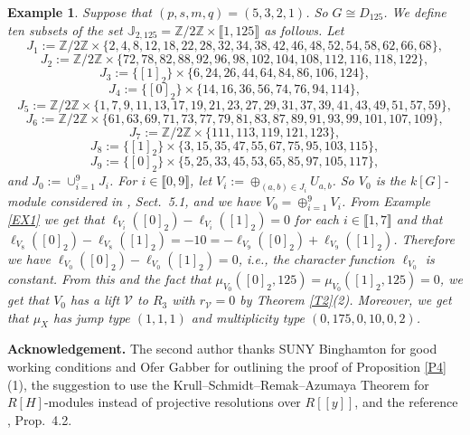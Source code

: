 \documentclass[11pt]{amsart}
\newtheorem{ex}[theorem]{Example}
\begin{document}
\begin{ex}\normalfont\label{EX14}
Suppose that $(p,s,m,q)=(5,3,2,1)$. So $G\cong D_{125}$. We define ten subsets of the set $\mathbb J_{2,125}=\mathbb Z/2\mathbb Z\times\llbracket1,125\rrbracket$ as follows. Let
$$J_1:=\mathbb Z/2\mathbb Z\times\{2,4,8,12,18,22,28,32,34,38,42,46,48,52,54,58,62,66,68\},$$
$$J_2:=\mathbb Z/2\mathbb Z\times\{72,78,82,88,92,96,98,102,104,108,112,116,118,122\},$$
$$J_3:=\{[1]_2\}\times\{6,24,26,44,64,84,86,106,124\},$$
$$J_4:=\{[0]_2\}\times\{14,16,36,56,74,76,94,114\},$$
$$J_5:=\mathbb Z/2\mathbb Z\times\{1,7,9,11,13,17,19,21,23,27,29,31,37,39,41,43,49,51,57,59\},$$
$$J_6:=\mathbb Z/2\mathbb Z\times\{61,63,69,71,73,77,79,81,83,87,89,91,93,99,101,107,109\},$$
$$J_7:=\mathbb Z/2\mathbb Z\times\{111,113,119,121,123\},$$
$$J_8:=\{[1]_2\}\times\{3,15,35,47,55,67,75,95,103,115\},$$
$$J_9:=\{[0]_2\}\times\{5,25,33,45,53,65,85,97,105,117\},$$
and $ J_0:=\cup_{i=1}^9 J_i$. For $i\in\llbracket0,9\rrbracket$, let $V_i:=\oplus_{(a,b)\in J_i} U_{a,b}$. So $V_0$ is the $k[G]$-module considered in \cite{KT2}, Sect.\ 5.1, and we have $V_0=\oplus_{i=1}^9 V_i$. From Example \ref{EX1} we get that $\ell_{V_i}([0]_2)-\ell_{V_i}([1]_2)=0$ for each $i\in\llbracket1,7\rrbracket$ and that $\ell_{V_8}([0]_2)-\ell_{V_8}([1]_2)=-10=-\ell_{V_9}([0]_2)+\ell_{V_9}([1]_2)$. Therefore we have $\ell_{V_0}([0]_2)-\ell_{V_0}([1]_2)=0$, i.e., the character function $\ell_{V_0}$ is constant. From this and the fact that $\mu_{V_0}([0]_2,125)=\mu_{V_0}([1]_2,125)=0$, we get that $V_0$ has a lift $\mathcal V$ to $R_3$ with $r_{\mathcal V}=0$ by Theorem \ref{T2}(2). Moreover, we get that $\mu_X$ has jump type $(1,1,1)$ and multiplicity type $(0,175,0,10,0,2)$.\end{ex}

\medskip\noindent
{\bf Acknowledgement.}
The second author thanks SUNY Binghamton for good working conditions and Ofer Gabber for outlining the proof of Proposition \ref{P4}(1), the suggestion to use the Krull--Schmidt--Remak--Azumaya Theorem for $R[H]$-modules instead of projective resolutions over $R[[y]]$, and the reference \cite{dJ}, Prop.\ 4.2. 
\end{document}
